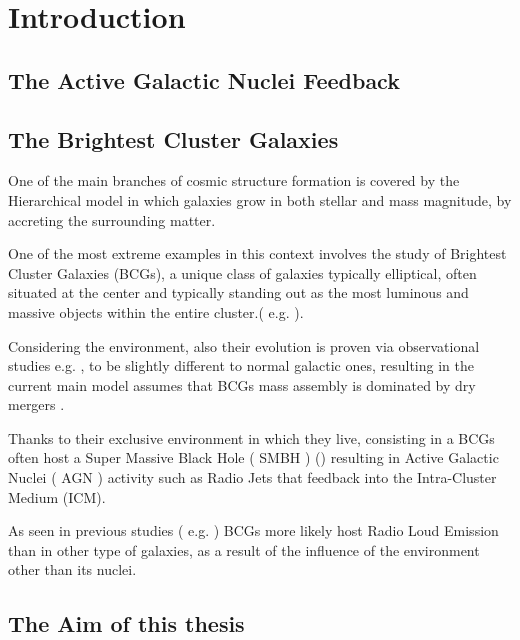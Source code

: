 \chapter{Introduction}

\section{The Active Galactic Nuclei Feedback}

\section{The Brightest Cluster Galaxies }
One of the main branches of cosmic structure formation is covered by the Hierarchical model in which galaxies grow in both stellar and mass magnitude, by accreting the surrounding matter.

One of the most extreme examples in this context involves the study of Brightest Cluster Galaxies (BCGs), a unique class of galaxies typically elliptical, often situated at the center and typically standing out as the most luminous and massive objects within the entire cluster.( e.g. \cite{2015MNRAS.448....2W} ).

Considering the environment, also their evolution is proven via observational studies e.g. \cite{2020MNRAS.498.2719T}, to be slightly different to normal galactic ones, resulting in the current main model assumes that BCGs mass assembly is dominated by dry mergers  \cite{2007MNRAS.375....2D, 2019ApJ...881..150C}.


Thanks to their exclusive environment in which they live, consisting in a BCGs often host a Super Massive Black Hole ( SMBH ) (\cite{2006ApJ...652..216R}) resulting in Active Galactic Nuclei ( AGN ) activity such as Radio Jets that feedback into the Intra-Cluster Medium (ICM)\cite{2007ARA&A..45..117M}.

As seen in previous studies ( e.g. \cite{2007MNRAS.379..867V} ) BCGs more likely host Radio Loud Emission than in other type of galaxies, as a result of the influence of the environment other than its nuclei.






\section{The Aim of this thesis}

